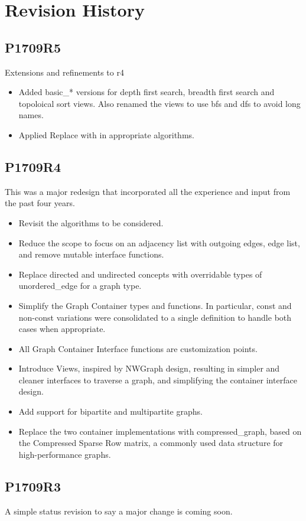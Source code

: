 \chapter*{Revision History}
\section*{P1709R5}
Extensions and refinements to r4
\begin{itemize}
\item Added basic\_* versions for depth first search, breadth first search and topoloical sort views. Also renamed the views to use bfs and dfs to avoid long names.
\item Applied Replace  with  in appropriate algorithms.
\end{itemize}

\section*{P1709R4}
This was a major redesign that incorporated all the experience and input from the past four years.
\begin{itemize}
\item Revisit the algorithms to be considered.
\item Reduce the scope to focus on an adjacency list with outgoing edges, edge list, and remove mutable interface functions. 
\item Replace directed and undirected concepts with overridable types of unordered\_edge for a graph type.
\item Simplify the Graph Container types and functions. In particular, const and non-const variations were consolidated to a single definition to handle both cases 
when appropriate.
\item All Graph Container Interface functions are customization points.
\item Introduce Views, inspired by NWGraph design, resulting in simpler and cleaner interfaces to traverse a graph, and simplifying the container interface design.
\item Add support for bipartite and multipartite graphs.
\item Replace the two container implementations with compressed\_graph, based on the Compressed Sparse Row matrix, a commonly used 
      data structure for high-performance graphs.
\end{itemize}

\section*{P1709R3}
A simple status revision to say a major change is coming soon.

